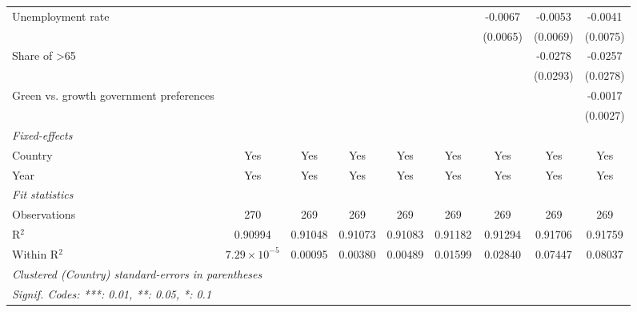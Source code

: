 \begin{table}[htbp]
\begin{tabular}{lcccccccc}
      Unemployment rate                                                 &                       &          &          &          &          & -0.0067  & -0.0053  & -0.0041\\   
                                                                        &                       &          &          &          &          & (0.0065) & (0.0069) & (0.0075)\\   
      Share of >65                                                      &                       &          &          &          &          &          & -0.0278  & -0.0257\\   
                                                                        &                       &          &          &          &          &          & (0.0293) & (0.0278)\\   
      Green vs. growth government preferences                           &                       &          &          &          &          &          &          & -0.0017\\   
                                                                        &                       &          &          &          &          &          &          & (0.0027)\\   
      \midrule
      \emph{Fixed-effects}\\
      Country                                                           & Yes                   & Yes      & Yes      & Yes      & Yes      & Yes      & Yes      & Yes\\  
      Year                                                              & Yes                   & Yes      & Yes      & Yes      & Yes      & Yes      & Yes      & Yes\\  
      \midrule
      \emph{Fit statistics}\\
      Observations                                                      & 270                   & 269      & 269      & 269      & 269      & 269      & 269      & 269\\  
      R$^2$                                                             & 0.90994               & 0.91048  & 0.91073  & 0.91083  & 0.91182  & 0.91294  & 0.91706  & 0.91759\\  
      Within R$^2$                                                      & $7.29\times 10^{-5}$  & 0.00095  & 0.00380  & 0.00489  & 0.01599  & 0.02840  & 0.07447  & 0.08037\\  
      \midrule \midrule
      \multicolumn{9}{l}{\emph{Clustered (Country) standard-errors in parentheses}}\\
      \multicolumn{9}{l}{\emph{Signif. Codes: ***: 0.01, **: 0.05, *: 0.1}}\\
   \end{tabular}
\end{table}


